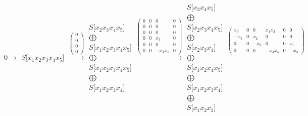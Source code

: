 \documentclass[12pt,a3paper,landscape]{amsart}
\numberwithin{equation}{section}
\theoremstyle{plain}
\theoremstyle{definition}
\begin{document}
$$
0 \rightarrow \begin{matrix}
S \lbrack x_{1}x_{2}x_{3}x_{4}x_{5} \rbrack
\end{matrix}
\xrightarrow{\left( \begin{matrix}
0 \\
0 \\
0 \\
0
\end{matrix} \right)}\begin{matrix}
S \lbrack x_{2}x_{3}x_{4}x_{5} \rbrack \\ \bigoplus \\
S \lbrack x_{1}x_{2}x_{3}x_{4}x_{5} \rbrack \\ \bigoplus \\
S \lbrack x_{1}x_{2}x_{3}x_{4}x_{5} \rbrack \\ \bigoplus \\
S \lbrack x_{1}x_{2}x_{3}x_{4} \rbrack
\end{matrix}
\xrightarrow{\left( \begin{matrix}
0 & 0 & 0 & 0 \\
0 & 0 & 0 & 0 \\
0 & 0 & 0 & 0 \\
0 & 0 & x_{3} & 0 \\
0 & 0 & 0 & 0 \\
0 & 0 & -x_{4}x_{5} & 0
\end{matrix} \right)}\begin{matrix}
S \lbrack x_{3}x_{4}x_{5} \rbrack \\ \bigoplus \\
S \lbrack x_{2}x_{3}x_{4}x_{5} \rbrack \\ \bigoplus \\
S \lbrack x_{2}x_{3}x_{4} \rbrack \\ \bigoplus \\
S \lbrack x_{1}x_{2}x_{4}x_{5} \rbrack \\ \bigoplus \\
S \lbrack x_{1}x_{2}x_{3}x_{4} \rbrack \\ \bigoplus \\
S \lbrack x_{1}x_{2}x_{3} \rbrack
\end{matrix}
\xrightarrow{\left( \begin{matrix}
x_{3} & 0 & 0 & x_{1}x_{2} & 0 & 0 \\
-x_{5} & 0 & x_{2} & 0 & 0 & 0 \\
0 & 0 & -x_{4} & 0 & 0 & x_{1} \\
0 & 0 & 0 & -x_{4}x_{5} & 0 & -x_{3}
\end{matrix} \right)}\begin{matrix}

\end{matrix}$$
\end{document}
